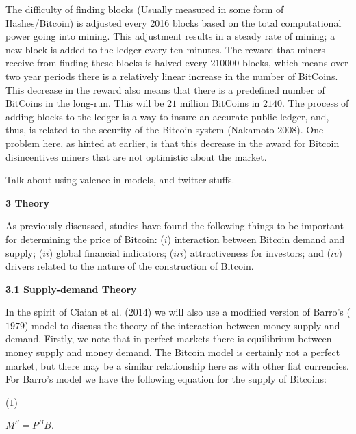 \documentclass{article}[10 pt]
\newcommand{\vs}{\vspace{0.1in}}
\begin{document}
\vs

The difficulty of finding blocks (Usually measured in some form of
Hashes/Bitcoin) is adjusted every 2016 blocks based on the
total computational power going into mining. This adjustment results in a
steady rate of mining; a new block is added to the ledger every ten minutes.
The reward that miners receive from finding these blocks is halved every
$210000$ blocks, which means over two year periods there is a relatively linear
increase in the number of BitCoins. This decrease in the reward also means
that there is a predefined number of BitCoins in the long-run. This will be
$21$ million BitCoins in $2140$. The process of adding blocks to the ledger
is a way to insure an accurate public ledger, and, thus, is related to the
security of the Bitcoin system (Nakamoto $2008$). One problem here, as
hinted at earlier, is that this decrease in the award for Bitcoin
disincentives miners that are not optimistic about the market.

\vs

Talk about using valence in models, and twitter stuffs.

\vs

\textbf{3 Theory}

\vs

As previously discussed, studies have found the following things to be
important for determining the price of Bitcoin: ($i$) interaction between
Bitcoin demand and supply; ($ii$) global financial indicators; ($iii$)
attractiveness for investors; and ($iv$) drivers related to the nature of
the construction of Bitcoin.

\vs

\textbf{3.1 Supply-demand Theory}

\vs

In the spirit of Ciaian et al. ($2014$) we will also use a modified version
of Barro’s ($1979$) model to discuss the theory of the interaction between
money supply and demand. Firstly, we note that in perfect markets there is
equilibrium between money supply and money demand. The Bitcoin model is
certainly not a perfect market, but there may be a similar relationship here
as with other fiat currencies. For Barro’s model we have the following
equation for the supply of Bitcoins:

\vs

($1$) \begin{center} $M^{S} = P^{B}B$. \end{center}

\vs
\end{document}
